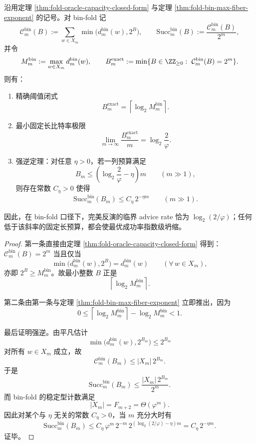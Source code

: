 \begin{theorem}\label{thm:fold-bin-exact-inversion-bitrate-strong-converse}
沿用定理 \ref{thm:fold-oracle-capacity-closed-form} 与定理 \ref{thm:fold-bin-max-fiber-exponent} 的记号。对 bin-fold 记
\[
\mathcal C_m^{\mathrm{bin}}(B)
:=
\sum_{w\in X_m}\min\bigl(d_m^{\mathrm{bin}}(w),2^B\bigr),
\qquad
\mathrm{Succ}_m^{\mathrm{bin}}(B):=\frac{\mathcal C_m^{\mathrm{bin}}(B)}{2^m},
\]
并令
\[
M_m^{\mathrm{bin}}:=\max_{w\in X_m}d_m^{\mathrm{bin}}(w),
\qquad
B_m^{\mathrm{exact}}
:=
\min\{B\in\ZZ_{\ge 0}:\ \mathcal C_m^{\mathrm{bin}}(B)=2^m\}.
\]
则有：
\begin{enumerate}
  \item 精确阈值闭式
  \[
  \boxed{\;
  B_m^{\mathrm{exact}}=\left\lceil \log_2 M_m^{\mathrm{bin}}\right\rceil.\;}
  \]
  \item 最小固定长比特率极限
  \[
  \boxed{\;
  \lim_{m\to\infty}\frac{B_m^{\mathrm{exact}}}{m}
  =
  \log_2\frac{2}{\varphi}.\;}
  \]
  \item 强逆定理：对任意 \(\eta>0\)，若一列预算满足
  \[
  B_m\le \left(\log_2\frac{2}{\varphi}-\eta\right)m
  \qquad(m\gg 1),
  \]
  则存在常数 \(C_\eta>0\) 使得
  \[
  \boxed{\;
  \mathrm{Succ}_m^{\mathrm{bin}}(B_m)\le C_\eta\,2^{-\eta m}
  \qquad(m\gg 1).\;}
  \]
\end{enumerate}
因此，在 bin-fold 口径下，完美反演的临界 advice rate 恰为 \(\log_2(2/\varphi)\)；任何低于该斜率的固定长预算，都会使最优成功率指数级坍缩。
\end{theorem}
\begin{proof}
第一条直接由定理 \ref{thm:fold-oracle-capacity-closed-form} 得到：\(\mathcal C_m^{\mathrm{bin}}(B)=2^m\) 当且仅当
\[
\min\bigl(d_m^{\mathrm{bin}}(w),2^B\bigr)=d_m^{\mathrm{bin}}(w)
\qquad(\forall\, w\in X_m),
\]
亦即 \(2^B\ge M_m^{\mathrm{bin}}\)。故最小整数 \(B\) 正是
\[
\left\lceil \log_2 M_m^{\mathrm{bin}}\right\rceil.
\]

第二条由第一条与定理 \ref{thm:fold-bin-max-fiber-exponent} 立即推出，因为
\[
0\le \left\lceil \log_2 M_m^{\mathrm{bin}}\right\rceil-\log_2 M_m^{\mathrm{bin}}<1.
\]

最后证明强逆。由平凡估计
\[
\min\bigl(d_m^{\mathrm{bin}}(w),2^{B_m}\bigr)\le 2^{B_m}
\]
对所有 \(w\in X_m\) 成立，故
\[
\mathcal C_m^{\mathrm{bin}}(B_m)\le |X_m|\,2^{B_m}.
\]
于是
\[
\mathrm{Succ}_m^{\mathrm{bin}}(B_m)
\le
\frac{|X_m|\,2^{B_m}}{2^m}.
\]
而 bin-fold 的稳定型计数满足
\[
|X_m|=F_{m+2}=\Theta(\varphi^m).
\]
因此对某个与 \(\eta\) 无关的常数 \(C_\eta>0\)，当 \(m\) 充分大时有
\[
\mathrm{Succ}_m^{\mathrm{bin}}(B_m)
\le
C_\eta\,\varphi^m\,2^{-m}\,
2^{(\log_2(2/\varphi)-\eta)m}
=
C_\eta\,2^{-\eta m}.
\]
证毕。
\end{proof}
